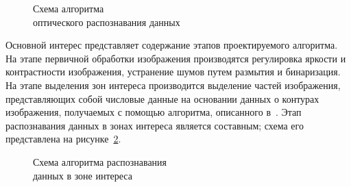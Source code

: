 \begin{figure}[h!]
  \centering
  \caption{Схема алгоритма \\ оптического распознавания данных}
  \label{fig:design_algorithm_basic}
\end{figure}

Основной интерес представляет содержание этапов проектируемого алгоритма.
На этапе первичной обработки изображения производятся
регулировка яркости и контрастности изображения,
устранение шумов путем размытия и бинаризация.
На этапе выделения зон интереса производится выделение частей изображения,
представляющих собой числовые данные на основании данных
о контурах изображения, получаемых с помощью алгоритма, описанного в~\cite{suzuki85}.
Этап распознавания данных в зонах интереса является составным;
схема его представлена на рисунке~\ref{fig:design_algorithm_recognition}.

\begin{figure}[h!]
  \centering
  \caption{Схема алгоритма распознавания \\ данных в зоне интереса}
  \label{fig:design_algorithm_recognition}
\end{figure}

